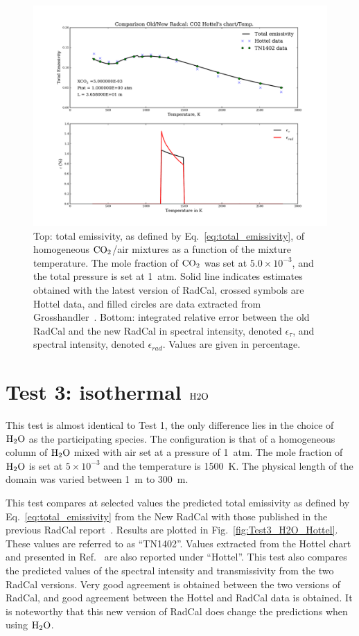\begin{figure}
\includegraphics[width=\textwidth]{Figures/Test2_CO2_Hottel.pdf}
\caption{Top: total emissivity, as defined by Eq.~\ref{eq:total_emissivity}, of homogeneous ${\rm CO_2}$/air mixtures as a function of the mixture temperature. The mole fraction of ${\rm CO_2}$ was set at $5.0 \times 10^{-3}$, and the total pressure is set at 1~atm. Solid line indicates estimates obtained with the latest version of RadCal, crossed symbols are Hottel data, and filled circles are data extracted from Grosshandler~\cite{Grosshandler1993}. Bottom: integrated relative error between the old RadCal and the new RadCal in spectral intensity, denoted $\epsilon_{\tau}$, and spectral intensity, denoted $\epsilon_{rad}$. Values are given in percentage.\label{fig:Test2_CO2_Hottel}}
\end{figure}


\section{Test 3: isothermal {$\rm H2O$ }}

This test is almost identical to Test 1, the only difference lies in the choice of $\rm H_2O$ as the participating species. The configuration is that of a homogeneous column of $\rm H_2O$ mixed with air set at a pressure of 1~atm. The mole fraction of $\rm H_2O$ is set at $5 \times 10^{-3}$ and the temperature is 1500~K. The physical length of the domain was varied between 1~m to 300~m.

This test compares at selected values the predicted total emissivity as defined by Eq.~\ref{eq:total_emissivity} from the New RadCal with those published in the previous RadCal report~\cite{Grosshandler1993}. Results are plotted in Fig.~\ref{fig:Test3_H2O_Hottel}. These values are referred to as ``TN1402''. Values extracted from the Hottel chart and presented in Ref.~\cite{Grosshandler1993} are also reported under ``Hottel''. This test also compares the predicted values of the spectral intensity and transmissivity from the two RadCal versions. Very good agreement is obtained between the two versions of RadCal, and good agreement between the Hottel and RadCal data is obtained. It is noteworthy that this new version of RadCal does change the predictions when using $\rm H_2O$.

